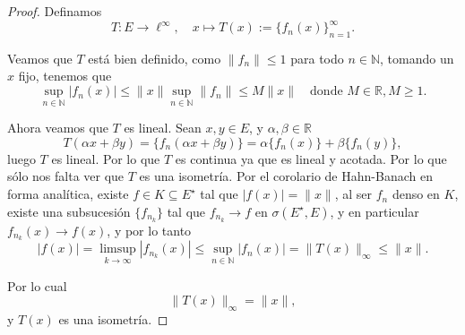 \begin{itemize}
\begin{proof}
Definamos
\[
T : E \to \ell^\infty, \quad x \mapsto T(x) := \{ f_n(x) \}_{n=1}^\infty.
\]

Veamos que $T$ está bien definido, como $\|f_n\| \leq 1$ para todo $n \in \mathbb{N}$, tomando un $x$ fijo, tenemos que
\[
\sup_{n \in \mathbb{N}} |f_n(x)| \leq \|x\| \sup_{n \in \mathbb{N}} \|f_n\| \leq M \|x\| \quad \text{donde } M \in \mathbb{R}, M \geq 1.
\]

Ahora veamos que $T$ es lineal. Sean $x, y \in E$, y $\alpha, \beta \in \mathbb{R}$
\[
T(\alpha x + \beta y) = \{ f_n(\alpha x + \beta y) \} = \alpha \{ f_n(x) \} + \beta \{ f_n(y) \},
\]
luego $T$ es lineal. Por lo que $T$ es continua ya que es lineal y acotada. Por lo que sólo nos falta ver que $T$ es una isometría. Por el corolario de Hahn-Banach en forma analítica, existe $f \in K \subseteq E^{\star}$ tal que $|f(x)| = \|x\|$, al ser $f_n$ denso en $K $, existe una subsucesión $\{f_{n_k}\}$ tal que $f_{n_k} \to f$ en $\sigma(E^{\star}, E)$, y en particular $f_{n_k}(x) \to f(x)$, y por lo tanto
\[
|f(x)| = \limsup_{k \to \infty} |f_{n_k}(x)| \leq \sup_{n \in \mathbb{N}} |f_n(x)| = \|T(x)\|_\infty \leq \|x\|.
\]

Por lo cual
\[
\|T(x)\|_\infty = \|x\|,
\]
y $T(x)$ es una isometría.

 \end{proof}
 \end{itemize}
 